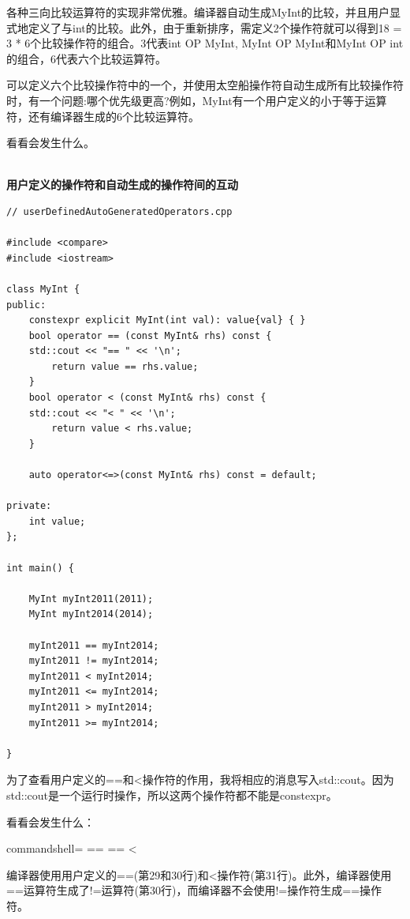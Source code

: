 各种三向比较运算符的实现非常优雅。编译器自动生成MyInt的比较，并且用户显式地定义了与int的比较。此外，由于重新排序，需定义2个操作符就可以得到18 = 3 * 6个比较操作符的组合。3代表int OP MyInt, MyInt OP MyInt和MyInt OP int的组合，6代表六个比较运算符。


可以定义六个比较操作符中的一个，并使用太空船操作符自动生成所有比较操作符时，有一个问题:哪个优先级更高?例如，MyInt有一个用户定义的小于等于运算符，还有编译器生成的6个比较运算符。

看看会发生什么。

\hspace*{\fill} \\ %
\noindent
\textbf{用户定义的操作符和自动生成的操作符间的互动}
\begin{lstlisting}[style=styleCXX]
// userDefinedAutoGeneratedOperators.cpp

#include <compare>
#include <iostream>

class MyInt {
public:
	constexpr explicit MyInt(int val): value{val} { }
	bool operator == (const MyInt& rhs) const {
	std::cout << "== " << '\n';
		return value == rhs.value;
	}
	bool operator < (const MyInt& rhs) const {
	std::cout << "< " << '\n';
		return value < rhs.value;
	}
	
	auto operator<=>(const MyInt& rhs) const = default;

private:
	int value;
};

int main() {

	MyInt myInt2011(2011);
	MyInt myInt2014(2014);
	
	myInt2011 == myInt2014;
	myInt2011 != myInt2014;
	myInt2011 < myInt2014;
	myInt2011 <= myInt2014;
	myInt2011 > myInt2014;
	myInt2011 >= myInt2014;

}
\end{lstlisting}

为了查看用户定义的==和<操作符的作用，我将相应的消息写入std::cout。因为std::cout是一个运行时操作，所以这两个操作符都不能是constexpr。

看看会发生什么：

\begin{tcblisting}{commandshell={}}
==
==
<
\end{tcblisting}

编译器使用用户定义的==(第29和30行)和<操作符(第31行)。此外，编译器使用==运算符生成了!=运算符(第30行)，而编译器不会使用!=操作符生成==操作符。


